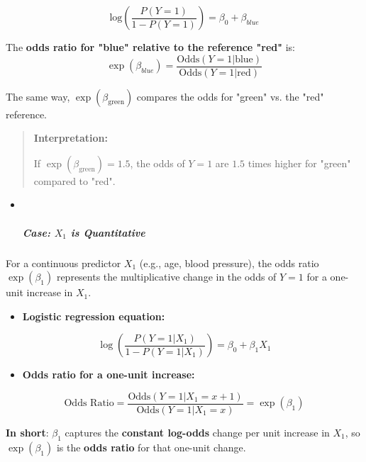 \documentclass{article}
\providecommand{\tightlist}{%
  \setlength{\itemsep}{0pt}\setlength{\parskip}{0pt}}
\begin{document}
\[\text{log}\left( \dfrac{P(Y=1)}{1 - P(Y=1)} \right) = \beta_0 + \beta_{blue}\]

The \textbf{odds ratio for "blue" relative to the reference "red"} is:
\[\exp(\beta_{blue}) = \dfrac{\text{Odds}(Y=1 | \text{blue})}{\text{Odds}(Y=1 | \text{red})}\]

The same way, \(\exp(\beta_{\text{green}})\)\hspace{0pt} compares the
odds for "green" vs. the "red" reference.

\begin{quote}
\textbf{Interpretation:}

If \(\exp(\beta_{\text{green}}) = 1.5\), the odds of \(Y=1\) are \(1.5\)
times higher for "green" compared to "red".
\end{quote}

\begin{itemize}
\item ~
  \subparagraph{\texorpdfstring{Case: \(X_1\) is
  Quantitative}{Case: X_1 is Quantitative}}\label{case-x_1-is-quantitative}
\end{itemize}

For a continuous predictor \(X_1\) (e.g., age, blood pressure), the odds
ratio \(\exp(\beta_1)\)\hspace{0pt} represents the multiplicative change
in the odds of \(Y=1\) for a one-unit increase in \(X_1\)\hspace{0pt}.

\begin{itemize}
\tightlist
\item
  \textbf{Logistic regression equation:}
\end{itemize}

\[\log\left(\dfrac{P(Y=1 | X_1)}{1 - P(Y=1 | X_1)}\right) = \beta_0 + \beta_1 X_1\]

\begin{itemize}
\tightlist
\item
  \textbf{Odds ratio for a one-unit increase:}
\end{itemize}

\[\text{Odds Ratio} = \frac{\text{Odds}(Y=1 | X_1 = x+1)}{\text{Odds}(Y=1 | X_1 = x)} = \exp(\beta_1)\]

\textbf{In short}: \(\beta_1\)\hspace{0pt} captures the \textbf{constant
log-odds} change per unit increase in \(X_1\), so
\(\exp(\beta_1)\)\hspace{0pt} is the \textbf{odds ratio} for that
one-unit change.
\end{document}
